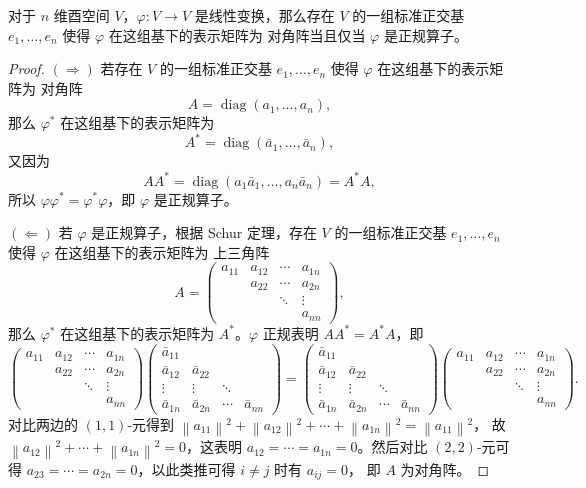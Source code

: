 \documentclass[fontset=none,zihao=-4]{Notes}
\DeclareMathOperator\diag{diag}
\newcommand{\norm}[1]{\left\lVert#1\right\rVert}
\begin{document}
\begin{theorem}[复谱定理]\label{thm:canonical form of complex normal operator}
  对于 $n$ 维酉空间 $V$，$\varphi:V\to V$ 是线性变换，那么存在 $V$ 的一组标准正交基 $e_1,\dots,e_n$ 使得 $\varphi$ 在这组基下的表示矩阵为
  对角阵当且仅当 $\varphi$ 是正规算子。
\end{theorem}
\begin{proof}
  $(\Rightarrow)$ 若存在 $V$ 的一组标准正交基 $e_1,\dots,e_n$ 使得 $\varphi$ 在这组基下的表示矩阵为
  对角阵
  \[
    A=\diag(a_1,\dots,a_n),  
  \]
  那么 $\varphi^*$ 在这组基下的表示矩阵为
  \[
    A^*=\diag(\bar a_1,\dots,\bar a_n) , 
  \]
  又因为
  \[
    AA^*=\diag(a_1\bar a_1,\dots,a_n\bar a_n)=A^*A,  
  \]
  所以 $\varphi\varphi^*=\varphi^*\varphi$，即 $\varphi$ 是正规算子。

  $(\Leftarrow)$ 若 $\varphi$ 是正规算子，根据 Schur 定理，存在
  $V$ 的一组标准正交基 $e_1,\dots,e_n$ 使得 $\varphi$ 在这组基下的表示矩阵为
  上三角阵
  \[
    A=
    \begin{pmatrix}
      a_{11} & a_{12} & \cdots & a_{1n} \\
      & a_{22} & \cdots & a_{2n} \\
      & & \ddots & \vdots \\
      & & & a_{nn}
    \end{pmatrix} , 
  \]
  那么 $\varphi^*$ 在这组基下的表示矩阵为 $A^*$。$\varphi$ 正规表明
  $AA^*=A^*A$，即
  \[
    \begin{pmatrix}
      a_{11} & a_{12} & \cdots & a_{1n} \\
      & a_{22} & \cdots & a_{2n} \\
      & & \ddots & \vdots \\
      & & & a_{nn}
    \end{pmatrix}
    \begin{pmatrix}
      \bar a_{11} &  &  &  \\
      \bar a_{12} & \bar a_{22} & & \\
      \vdots & \vdots & \ddots & \\
      \bar a_{1n} &  \bar a_{2n} & \cdots & \bar a_{nn}
    \end{pmatrix}=
    \begin{pmatrix}
      \bar a_{11} &  &  &  \\
      \bar a_{12} & \bar a_{22} & & \\
      \vdots & \vdots & \ddots & \\
      \bar a_{1n} &  \bar a_{2n} & \cdots & \bar a_{nn}
    \end{pmatrix}
    \begin{pmatrix}
      a_{11} & a_{12} & \cdots & a_{1n} \\
      & a_{22} & \cdots & a_{2n} \\
      & & \ddots & \vdots \\
      & & & a_{nn}
    \end{pmatrix}.
  \]
  对比两边的 $(1,1)$-元得到 $\norm{a_{11}}^2+\norm{a_{12}}^2+\cdots+\norm{a_{1n}}^2=\norm{a_{11}}^2$，
  故 $\norm{a_{12}}^2+\cdots+\norm{a_{1n}}^2=0$，这表明
  $a_{12}=\cdots=a_{1n}=0$。然后对比 $(2,2)$-元可得
  $a_{23}=\cdots=a_{2n}=0$，以此类推可得 $i\neq j$ 时有 $a_{ij}=0$，
  即 $A$ 为对角阵。
\end{proof}
\end{document}

